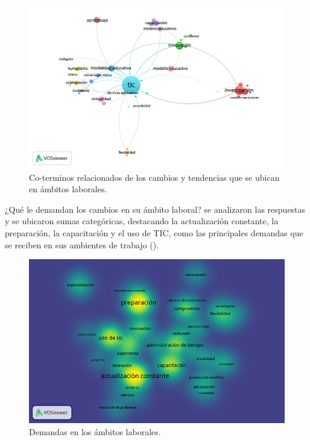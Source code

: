 \documentclass{textolivre}
\begin{document}
\begin{figure}[htbp]
 \centering
 \includegraphics[width=\textwidth]{Fig6.png}
 \caption{Co-terminos relacionados de los cambios y tendencias
que se ubican en ámbitos laborales.}
 \label{fig6}
\end{figure}

¿Qué le demandan los cambios en su ámbito laboral? se analizaron las respuestas y se ubicaron sumas categóricas, destacando la actualización constante, la preparación, la capacitación y el uso de TIC, como las principales demandas que se reciben en sus ambientes de trabajo ().

\begin{figure}[htbp]
 \centering
 \includegraphics[width=\textwidth]{Fig7.png}
 \caption{Demandas en los ámbitos laborales.}
 \label{fig7}
\end{figure}
\end{document}
